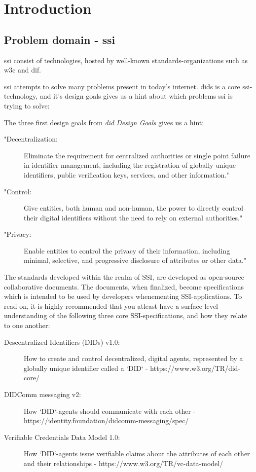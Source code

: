 \chapter{Introduction}
\section{Problem domain - \acrfull{ssi}}

\acrfull{ssi} consist of technologies, hosted by well-known standards-organizations such as \acrfull{w3c} and \acrfull{dif}.

\acrshort{ssi} attempts to solve many problems present in today's internet. \acrfull{did}s is a core \acrshort{ssi}-technology, and it's design goals gives us a hint about which problems \acrshort{ssi} is trying to solve:

The three first design goals from \textit{\acrshort{did} Design Goals}\cite{DIDDesignGoals} gives us a hint:

\begin{description}
    \item["Decentralization:] Eliminate the requirement for centralized authorities or single point failure in identifier management, including the registration of globally unique identifiers, public verification keys, services, and other information."
    \item["Control:] Give entities, both human and non-human, the power to directly control their digital identifiers without the need to rely on external authorities."
    \item ["Privacy:] Enable entities to control the privacy of their information, including minimal, selective, and progressive disclosure of attributes or other data."
\end{description}


The standards developed within the realm of SSI, are developed as open-source collaborative documents. The documents, when finalized, become specifications which is intended to be used by developers whenementing SSI-applications. To read on, it is highly recommended that you atleast have a surface-level understanding of the following three core SSI-specifications, and how they relate to one another: 
\begin{description}
    \item [Descentralized Identifiers (DIDs) v1.0:] How to create and control decentralized, digital agents, represented by a globally unique identifier called a `DID` - https://www.w3.org/TR/did-core/
    \item [DIDComm messaging v2:] How `DID`-agents should communicate with each other - https://identity.foundation/didcomm-messaging/spec/ 
    \item [Verifiable Credentials Data Model 1.0:] How `DID`-agents issue verifiable claims about the attributes of each other and their relationships - https://www.w3.org/TR/vc-data-model/ 
\end{description}

